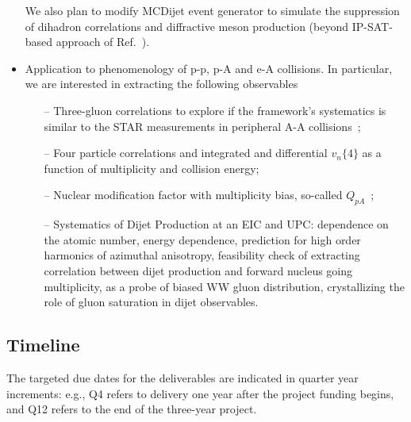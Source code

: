 \begin{itemize}
				We also plan to modify MCDijet event generator to simulate the 
				suppression of dihadron correlations and diffractive meson production (beyond IP-SAT-based approach of Ref.~\cite{Toll:2012mb}). 	

			\item Application to phenomenology of p-p, p-A and e-A collisions. 
				In particular, we are interested in extracting the following observables 
				\begin{itemize}
					\item[--] Three-gluon correlations to explore if 
						the framework's systematics is similar to the STAR measurements
						in peripheral A-A collisions~\cite{Adamczyk:2017hdl,Adamczyk:2017byf};  	
					\item[--] Four particle correlations and integrated and differential $v_n\{4\}$ as a function of  multiplicity and collision energy; 
					\item[--] Nuclear modification factor with multiplicity bias, so-called $Q_{pA}$~\cite{Adam:2014qja};   
					\item[--] 
					Systematics of Dijet Production at an EIC and UPC: 
					dependence on the atomic number, energy dependence, 
					prediction for high order harmonics of azimuthal anisotropy, 
					feasibility check of extracting correlation between dijet production and forward nucleus going  multiplicity, as a probe of biased WW gluon distribution, crystallizing the role of gluon saturation in dijet observables.  
				\end{itemize}
		\end{itemize} 
		
		
		




    \vspace{0.5em}
    \subsection{Timeline}
        \label{sec:p12}
The targeted due dates for the deliverables are indicated in quarter year
increments: e.g., Q4 refers to delivery one year after the project funding
begins, and Q12 refers to the end of the three-year project.

